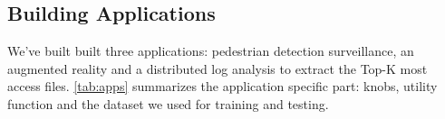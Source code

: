 




\subsection{Building Applications}
\label{sec:build-appl}

We've built built three applications: pedestrian detection surveillance, an
augmented reality and a distributed log analysis to extract the Top-K most
access files. \autoref{tab:apps} summarizes the application specific part:
knobs, utility function and the dataset we used for training and testing.

